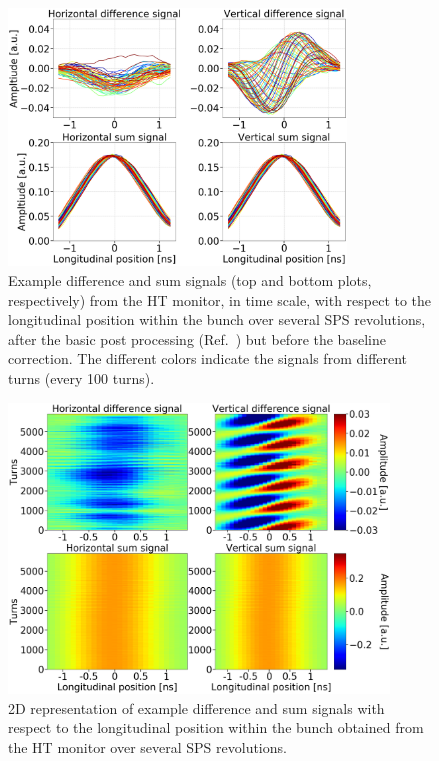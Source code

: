 \begin{figure}[!h]
   \centering         
   \includegraphics[width=0.8\textwidth]{images/Ch4/HT_1D__20180530_135105exampleAcq_4thesis_turnsStart0_Stop6000_step100_new.png}
       \caption{Example difference and sum signals (top and bottom plots, respectively) from the HT monitor, in time scale, with respect to the longitudinal position within the bunch over several SPS revolutions, after the basic post processing (Ref.~\cite{Levens:2313358}) but before the baseline correction. The different colors indicate the signals from different turns (every 100 turns). } %
       \label{fig:HT_example_signals}
\end{figure}

\begin{figure}[!h]
   \centering         
   \includegraphics[width=0.9\textwidth]{images/Ch4/HT_2D__20180530_135105_colorbar_new_version.png}
       \caption{2D representation of example difference and sum signals with respect to the longitudinal position within the bunch obtained from the HT monitor over several SPS revolutions.}
       \label{fig:HT_example_signals_2D}
\end{figure}

